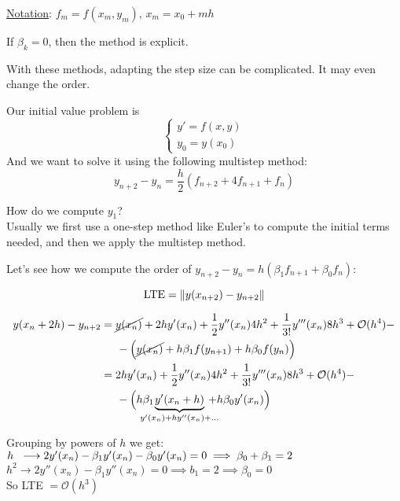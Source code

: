 \underline{Notation}: $f_m = f(x_m, y_m), \, x_m = x_0 + mh$

\begin{remark}
  If $\beta_k = 0$, then the method is explicit.
\end{remark}

\begin{remark}
  With these methods, adapting the step size can be complicated. It may even change the order.
\end{remark}

\begin{example}
    Our initial value problem is
    \[
      \begin{cases}
        y' = f(x,y) \\
        y_0 = y(x_0)
      \end{cases}
    \]
    And we want to solve it using the following multistep method:
    \[
      y_{n+2} - y_n = \frac{h}{2}(f_{n+2} + 4f_{n+1} + f_n)
    \]
    
    How do we compute $y_1$? \\
    
    Usually we first use a one-step method like Euler's to compute the initial terms needed, and then we apply the multistep method.
\end{example}

\begin{example}

Let's see how we compute the order of $y_{n+2}-y_n = h(\beta_1f_{n+1} + \beta_0f_n)$:

\[
  \text{LTE} = \left\lVert y(x_{n+2}) - y_{n+2}\right\rVert
\]

\begin{align*}
    y(x_n + 2h) - y_{n+2} &= \cancel{y(x_n)} + 2hy'(x_n) + \frac{1}{2}y''(x_n)4h^2 + \frac{1}{3!}y'''(x_n)8h^3 + \mathcal{O}(h^4) - \\
    &\hspace{0.5cm}- \Big(\cancel{y(x_n)} + h\beta_1f(y_{n+1}) + h\beta_0f(y_n) \Big) \\
    &= 2hy'(x_n) + \frac{1}{2}y''(x_n)4h^2 + \frac{1}{3!}y'''(x_n)8h^3 + \mathcal{O}(h^4) - \\
    &\hspace{0.5cm}- \Big(h\beta_1\hspace{-0.5cm}\underbrace{y'(x_n + h)}_{y'(x_n) + hy''(x_n) + \ldots}\hspace{-0.4cm} + h\beta_0y'(x_n) \Big) \\
\end{align*}

\newpage

Grouping by powers of $h$ we get:\\

$h \hspace{0.2cm}\longrightarrow 2y'(x_n) - \beta_1y'(x_n) - \beta_0y'(x_n) = 0 \implies \beta_0 + \beta_1 = 2$\\

$h^2 \longrightarrow 2y''(x_n) - \beta_1y''(x_n) = 0 \implies b_1 = 2 \implies \beta_0 = 0$\\

So LTE $= \mathcal{O}(h^3)$\\
\end{example}

